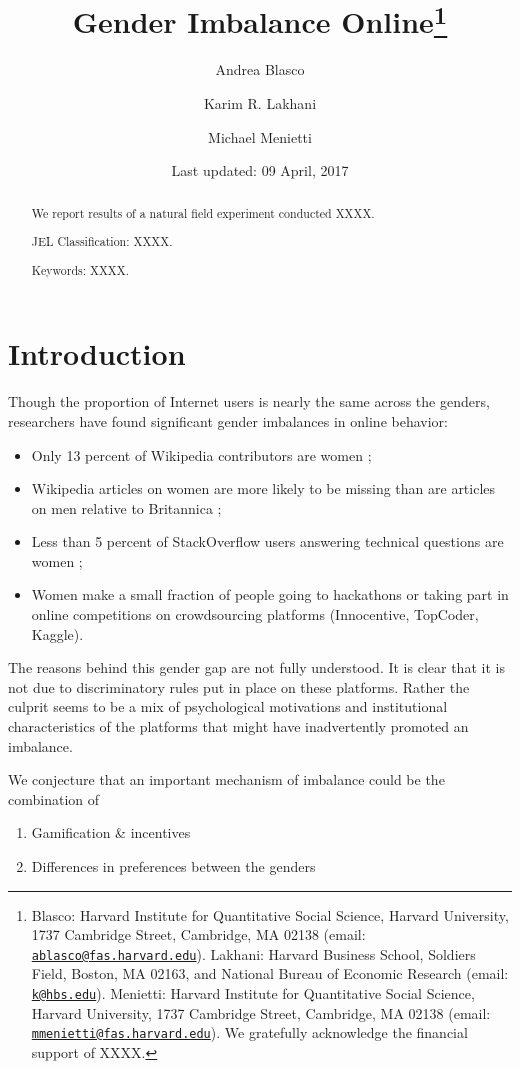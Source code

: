 \documentclass[12pt, titlepage]{article}
\institute{}
\title{Gender Imbalance Online\thanks{Blasco: Harvard Institute for Quantitative Social Science, Harvard
University, 1737 Cambridge Street, Cambridge, MA 02138 (email:
\href{mailto:ablasco@fas.harvard.edu}{\nolinkurl{ablasco@fas.harvard.edu}}).
Lakhani: Harvard Business School, Soldiers Field, Boston, MA 02163, and
National Bureau of Economic Research (email:
\href{mailto:k@hbs.edu}{\nolinkurl{k@hbs.edu}}). Menietti: Harvard
Institute for Quantitative Social Science, Harvard University, 1737
Cambridge Street, Cambridge, MA 02138 (email:
\href{mailto:mmenietti@fas.harvard.edu}{\nolinkurl{mmenietti@fas.harvard.edu}}).
We gratefully acknowledge the financial support of XXXX.}}
\author{Andrea Blasco \and Karim R. Lakhani \and Michael Menietti}
\date{Last updated: 09 April, 2017}
\providecommand{\tightlist}{%
  \setlength{\itemsep}{0pt}\setlength{\parskip}{0pt}}
\begin{document}
\maketitle
\begin{abstract}
We report results of a natural field experiment conducted XXXX.

\smallskip\noindent 
JEL Classification: XXXX.

\smallskip\noindent 
Keywords: XXXX.
\end{abstract}


\clearpage

\section{Introduction}\label{introduction}

Though the proportion of Internet users is nearly the same across the
genders, researchers have found significant gender imbalances in online
behavior:

\begin{itemize}
\tightlist
\item
  Only 13 percent of Wikipedia contributors are women
  \citep{hill2013wikipedia};
\item
  Wikipedia articles on women are more likely to be missing than are
  articles on men relative to Britannica \citep{reagle2011gender};
\item
  Less than 5 percent of StackOverflow users answering technical
  questions are women \citep{vasilescu2012gender};
\item
  Women make a small fraction of people going to hackathons or taking
  part in online competitions on crowdsourcing platforms (Innocentive,
  TopCoder, Kaggle).
\end{itemize}

The reasons behind this gender gap are not fully understood. It is clear
that it is not due to discriminatory rules put in place on these
platforms. Rather the culprit seems to be a mix of psychological
motivations and institutional characteristics of the platforms that
might have inadvertently promoted an imbalance.

We conjecture that an important mechanism of imbalance could be the
combination of

\begin{enumerate}
\def\labelenumi{\arabic{enumi}.}
\tightlist
\item
  Gamification \& incentives
\item
  Differences in preferences between the genders
\end{enumerate}
\end{document}
